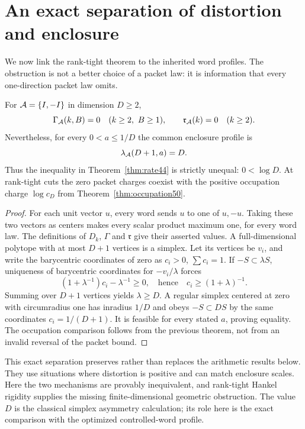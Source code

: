\section{An exact separation of distortion and enclosure}\label{sec:separation50}
We now link the rank-tight theorem to the inherited word profiles.
The obstruction is not a better choice of a packet law: it is information
that every one-direction packet law omits.

\begin{theorem}\label{thm:separation50}
For $\mathcal A=\{I,-I\}$ in dimension $D\ge2$,
\[
 \Gamma_{\calA}(k,B)=0\quad(k\ge2,\ B\ge1),\qquad
 \mathfrak r_{\calA}(k)=0\quad(k\ge2).
\]
Nevertheless, for every $0<a\le1/D$ the common enclosure profile is
\begin{equation}\label{eq:lambda50}
 \lambda_{\mathcal A}(D+1,a)=D.
\end{equation}
Thus the inequality in Theorem~\ref{thm:rate44} is strictly unequal:
$0<\log D$. At rank-tight cuts the zero packet charges coexist with
the positive occupation charge $\log c_D$ from
Theorem~\ref{thm:occupation50}.
\end{theorem}
\begin{proof}
For each unit vector $u$, every word sends $u$ to one of $u,-u$.
Taking these two vectors as centers makes every scalar product maximum
one, for every word law. The definitions of $D_k$, $\Gamma$ and
$\mathfrak r$ give their asserted values.
A full-dimensional polytope with at most $D+1$ vertices is a simplex.
Let its vertices be $v_i$, and write the barycentric coordinates of
zero as $c_i>0$, $\sum c_i=1$. If $-S\subset\lambda S$, uniqueness of
barycentric coordinates for $-v_i/\lambda$ forces
\[
 (1+\lambda^{-1})c_i-\lambda^{-1}\ge0,
 \quad\text{hence}\quad c_i\ge(1+\lambda)^{-1}.
\]
Summing over $D+1$ vertices yields $\lambda\ge D$. A regular simplex
centered at zero with circumradius one has inradius $1/D$ and obeys
$-S\subset D S$ by the same coordinates $c_i=1/(D+1)$.
It is feasible for every stated $a$, proving equality. The occupation
comparison follows from the previous theorem, not from an invalid
reversal of the packet bound.
\end{proof}

This exact separation preserves rather than replaces the arithmetic
results below. They use situations where distortion is positive and
can match enclosure scales. Here the two mechanisms are provably
inequivalent, and rank-tight Hankel rigidity supplies the missing
finite-dimensional geometric obstruction. The value $D$ is the
classical simplex asymmetry calculation; its role here is the exact
comparison with the optimized controlled-word profile.
